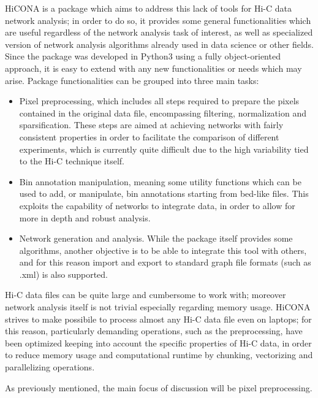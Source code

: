HiCONA is a package which aims to address this lack of tools for Hi-C data network analysis; in order to do so, it provides some general functionalities which are useful regardless of the network analysis task of interest, as well as specialized version of network analysis algorithms already used in data science or other fields. Since the package was developed in Python3 using a fully object-oriented approach, it is easy to extend with any new functionalities or needs which may arise. Package functionalities can be grouped into three main tasks:
\begin{itemize}\tightlist
  \item Pixel preprocessing, which includes all steps required to prepare the pixels contained in the original data file, encompassing filtering, normalization and sparsification. These steps are aimed at achieving networks with fairly consistent properties in order to facilitate the comparison of different experiments, which is currently quite difficult due to the high variability tied to the Hi-C technique itself.
  \item Bin annotation manipulation, meaning some utility functions which can be used to add, or manipulate, bin annotations starting from bed-like files. This exploits the capability of networks to integrate data, in order to allow for more in depth and robust analysis. 
  \item Network generation and analysis. While the package itself provides some algorithms, another objective is to be able to integrate this tool with others, and for this reason import and export to standard graph file formats (such as .xml) is also supported.  
\end{itemize}

Hi-C data files can be quite large and cumbersome to work with; moreover network analysis itself is not trivial especially regarding memory usage. HiCONA strives to make possibile to process almost any Hi-C data file even on laptops; for this reason, particularly demanding operations, such as the preprocessing, have been optimized keeping into account the specific properties of Hi-C data, in order to reduce memory usage and computational runtime by chunking, vectorizing and parallelizing operations.

As previously mentioned, the main focus of discussion will be pixel preprocessing.

